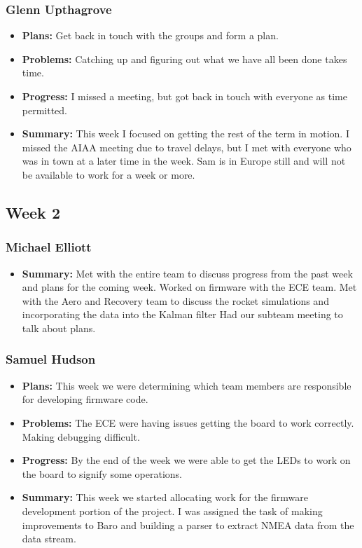 \documentclass[onecolumn, draftclsnofoot,10pt, compsoc]{IEEEtran}
\begin{document}
\subsubsection{Glenn Upthagrove}
\begin {itemize}
 \item \textbf{Plans: }Get back in touch with the groups and form a plan.   
 \item \textbf{Problems: }Catching up and figuring out what we have all been done takes time.  
 \item \textbf{Progress: }I missed a meeting, but got back in touch with everyone as time permitted. 
 \item \textbf{Summary: }This week I focused on getting the rest of the term in motion. I missed the AIAA meeting due to travel delays, but I met with everyone who was in town at a later time in the week. Sam is in Europe still and will not be available to work for a week or more.  
\end {itemize}

\subsection{Week 2}
\subsubsection{Michael Elliott}
\begin {itemize}
 \item \textbf{Summary: }Met with the entire team to discuss progress from the past week and
plans for the coming week.
Worked on firmware with the ECE team.
Met with the Aero and Recovery team to discuss the rocket simulations
and incorporating the data into the Kalman filter
Had our subteam meeting to talk about plans.
\end{itemize}
\subsubsection{Samuel Hudson}
\begin {itemize}
 \item \textbf{Plans: }This week we were determining which team members are responsible for developing firmware code. 
 \item \textbf{Problems: }The ECE were having issues getting the board to work correctly. Making debugging difficult. 
 \item \textbf{Progress: }By the end of the week we were able to get the LEDs to work on the board to signify some operations. 
 \item \textbf{Summary: }This week we started allocating work for the firmware development portion of the project. I was assigned the task of making improvements to Baro and building a parser to extract NMEA data from the data stream.
\end {itemize}
\end{document}
